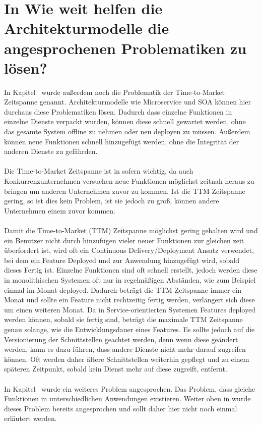 \section{In Wie weit helfen die Architekturmodelle die angesprochenen Problematiken zu lösen?}
\label{sec:LoesungDerProblematiken}
In Kapitel \ wurde außerdem noch die Problematik der Time-to-Market Zeitspanne genannt. Architekturmodelle wie Microservice und SOA können hier durchaus diese Problematiken lösen. Dadurch dass einzelne Funktionen in einzelne Dienste verpackt wurden, können diese schnell gewartet werden, ohne das gesamte System offline zu nehmen oder neu deployen zu müssen. Außerdem können neue Funktionen schnell hinzugefügt werden, ohne die Integrität der anderen Dienste zu gefährden.
\\\\
Die Time-to-Market Zeitspanne ist in sofern wichtig, da auch Konkurrenzunternehmen versuchen neue Funktionen möglichst zeitnah heraus zu bringen um anderen Unternehmen zuvor zu kommen. Ist die TTM-Zeitspanne gering, so ist dies kein Problem, ist sie jedoch zu groß, können andere Unternehmen einem zuvor kommen.
\\\\
Damit die Time-to-Market (TTM) Zeitspanne möglichst gering gehalten wird und ein Benutzer nicht durch hinzufügen vieler neuer Funktionen zur gleichen zeit überfordert ist, wird oft ein Continuous Delivery/Deployment Ansatz verwendet, bei dem ein Feature Deployed und zur Anwendung hinzugefügt wird, sobald dieses Fertig ist. Einzelne Funktionen sind oft schnell erstellt, jedoch werden diese in monolithischen Systemen oft nur in regelmäßigen Abständen, wie zum Beispiel einmal im Monat deployed. Dadurch beträgt die TTM Zeitspanne immer ein Monat und sollte ein Feature nicht rechtzeitig fertig werden, verlängert sich diese um einen weiteren Monat. Da in Service-orientierten Systemen Features deployed werden können, sobald sie fertig sind, beträgt die maximale TTM Zeitspanne genau solange, wie die Entwicklungsdauer eines Features. Es sollte jedoch auf die Versionierung der Schnittstellen geachtet werden, denn wenn diese geändert werden, kann es dazu führen, dass andere Dienste nicht mehr darauf zugreifen können. Oft werden daher ältere Schnittstellen weiterhin gepflegt und zu einem späteren Zeitpunkt, sobald kein Dienst mehr auf diese zugreift, entfernt.
\\\\
In Kapitel \ wurde ein weiteres Problem angesprochen. Das Problem, dass gleiche Funktionen in unterschiedlichen Anwendungen existieren. Weiter oben in  wurde dieses Problem bereits angesprochen und sollt daher hier nicht noch einmal erläutert werden.

